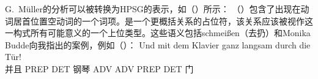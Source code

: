 \begin{exe}
\begin{xlist}[iv.]
\begin{exe}
\begin{xlist}[iv.]
G.\ Müller的分析可以被转换为HPSG的表示，如（）所示：
\ea
{}
\z
（）包含了出现在动词居首位置空动词的一个词项。是一个更概括关系的占位符，该关系应该被视作这一构式所有可能意义的一个上位类型。这些语义包括schmeißen（去扔）和Monika Budde向我指出的案例，例如（）：
\ea
\label{Klavier-durch-die-Tuer}
\gll Und mit dem Klavier ganz langsam durch die Tür!\\
	 并且 PREP DET 钢琴 ADV ADV PREP DET 门\\

\end{xlist}
\end{exe}
\end{xlist}
\end{exe}
